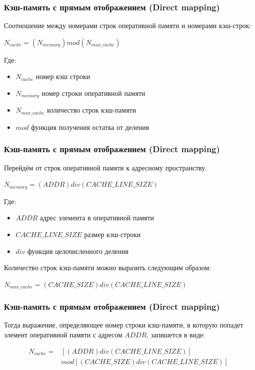 \documentclass{beamer}
\begin{document}

\begin{frame}
\frametitle{Кэш-память с прямым отображением (Direct mapping)}

Соотношение между номерами строк оперативной памяти и номерами кэш-­строк:

\begin{center}
$N_{cache} = (N_{memory})mod(N_{max\_cache})$
\end{center}

Где:
\begin{itemize}
\item $N_{cache}$ номер кэш строки
\item $N_{memory}$ номер строки оперативной памяти
\item $N_{max\_cache}$ количество строк кэш-памяти
\item $mod$ функция получения остатка от деления
\end{itemize}

\end{frame}


\begin{frame}
\frametitle{Кэш-память с прямым отображением (Direct mapping)}

Перейдём от строк оперативной памяти к адресному пространству.

\begin{center}
$N_{memory} = (ADDR)div(CACHE\_LINE\_SIZE)$
\end{center}

Где:
\begin{itemize}
\item $ADDR$ адрес элемента в оперативной памяти
\item $CACHE\_LINE\_SIZE$ размер кэш-строки
\item $div$ функция целочисленного деления
\end{itemize}

Количество строк кэш-памяти можно выразить следующим образом:

\begin{center}
$N_{max\_cache} = (CACHE\_SIZE)div(CACHE\_LINE\_SIZE)$
\end{center}
\end{frame}


\begin{frame}
\frametitle{Кэш-память с прямым отображением (Direct mapping)}

Тогда выражение, определяющее номер строки кэш-памяти, в которую попадет элемент оперативной памяти с адресом $ADDR$, запишется в виде:

\begin{align*}
N_{cache} =& [(ADDR)div(CACHE\_LINE\_SIZE)] \\
& mod [(CACHE\_SIZE)div(CACHE\_LINE\_SIZE)]
\end{align*}

\end{frame}
\end{document}
